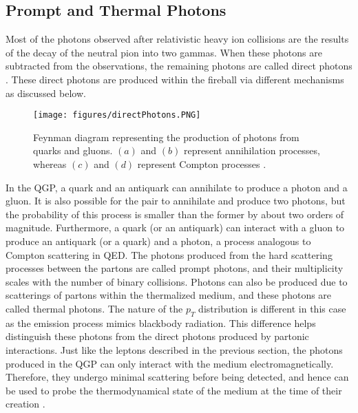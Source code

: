 \subsection{Prompt and Thermal Photons}
Most of the photons observed after relativistic heavy ion collisions are the results of the decay of the neutral pion into two gammas. %
When these photons are subtracted from the observations, the remaining photons are called direct photons \cite{PAQUET2016409}. These direct photons are produced within the fireball via different mechanisms as discussed below.
\begin{figure}[!b]
  \centering
  \texttt{[image: figures/directPhotons.PNG]}
  \caption{Feynman diagram representing the production of photons from quarks and gluons. $(a)$ and $(b)$ represent annihilation processes, whereas $(c)$ and $(d)$ represent Compton processes \cite{wong1994introduction}.}\label{fig:directPhotons}
\end{figure}

In the QGP, a quark and an antiquark can annihilate to produce a photon and a gluon. It is also possible for the pair to annihilate and produce two photons, but the probability of this process is smaller than the former by about two orders of magnitude. Furthermore, a quark (or an antiquark) can interact with a gluon to produce an antiquark (or a quark) and a photon, a process analogous to Compton scattering in QED. The photons produced from the hard scattering processes between the partons are called prompt photons, and their multiplicity scales with the number of binary collisions. Photons can also be produced due to scatterings of partons within the thermalized medium, and these photons are called thermal photons. The nature of the $p_{T}$ distribution is different in this case as the emission process mimics blackbody radiation. This difference helps distinguish these photons from the direct photons produced by partonic interactions. Just like the leptons described in the previous section, the photons produced in the QGP can only interact with the medium electromagnetically. Therefore, they undergo minimal scattering before being detected, and hence can be used to probe the thermodynamical state of the medium at the time of their creation \cite{wong1994introduction,PAQUET2016409,Wilde:2012wc}.

